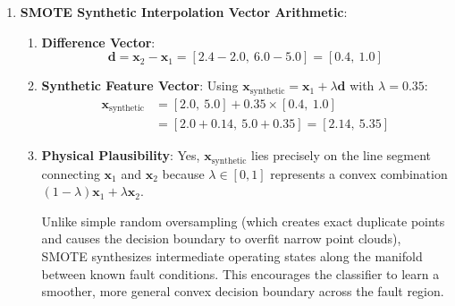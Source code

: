 \begin{enumerate}
\begin{enumerate}[label=(\alph*)]
        \item \textbf{Business Decision}:
        \textbf{Model B is vastly superior}. Despite lower accuracy ($94\%$ vs $98\%$) and lower precision ($31\%$ vs $100\%$), Model B catches $5$ out of $6$ catastrophic failures, reducing operational failure costs from $\$20{,}000$ down to $\$5{,}550$. It saves the wind farm operator:
        \begin{equation*}
        \text{Savings} = \$20{,}000 - \$5{,}550 = \mathbf{\$14{,}450}
        \end{equation*}
    \end{enumerate}

    \item \textbf{SMOTE Synthetic Interpolation Vector Arithmetic}:
    \begin{enumerate}[label=(\alph*)]
        \item \textbf{Difference Vector}:
        \begin{equation*}
        \mathbf{d} = \mathbf{x}_2 - \mathbf{x}_1 = [2.4 - 2.0, \ 6.0 - 5.0] = [\mathbf{0.4}, \ \mathbf{1.0}]
        \end{equation*}

        \item \textbf{Synthetic Feature Vector}:
        Using $\mathbf{x}_{\text{synthetic}} = \mathbf{x}_1 + \lambda \mathbf{d}$ with $\lambda = 0.35$:
        \begin{align*}
        \mathbf{x}_{\text{synthetic}} &= [2.0, \ 5.0] + 0.35 \times [0.4, \ 1.0] \\
        &= [2.0 + 0.14, \ 5.0 + 0.35] = [\mathbf{2.14}, \ \mathbf{5.35}]
        \end{align*}

        \item \textbf{Physical Plausibility}:
        Yes, $\mathbf{x}_{\text{synthetic}}$ lies precisely on the line segment connecting $\mathbf{x}_1$ and $\mathbf{x}_2$ because $\lambda \in [0, 1]$ represents a convex combination $(1 - \lambda)\mathbf{x}_1 + \lambda \mathbf{x}_2$. 
        
        Unlike simple random oversampling (which creates exact duplicate points and causes the decision boundary to overfit narrow point clouds), SMOTE synthesizes intermediate operating states along the manifold between known fault conditions. This encourages the classifier to learn a smoother, more general convex decision boundary across the fault region.
    \end{enumerate}
\end{enumerate}
